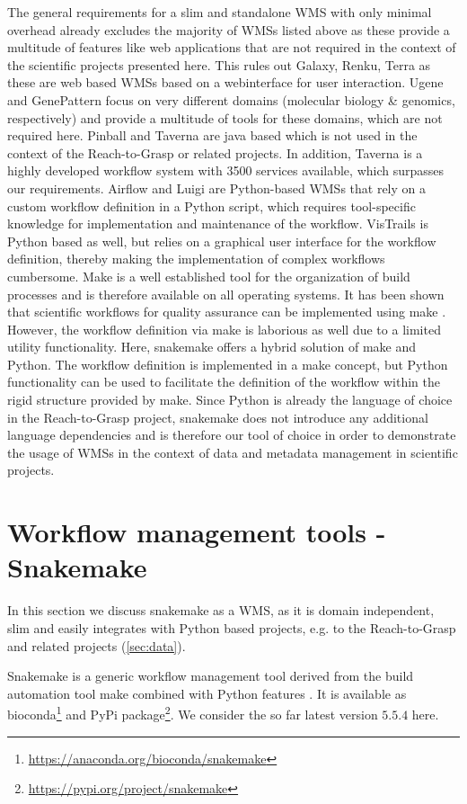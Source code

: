 The general requirements for a slim and standalone WMS with only minimal overhead already excludes the majority of WMSs listed above as these provide a multitude of features like web applications that are not required in the context of the scientific projects presented here. This rules out Galaxy, Renku, Terra as these are web based WMSs based on a webinterface for user interaction. Ugene and GenePattern focus on very different domains (molecular biology \& genomics, respectively) and provide a multitude of tools for these domains, which are not required here. Pinball and Taverna are java based which is not used in the context of the Reach-to-Grasp or related projects.  In addition, Taverna is a highly developed workflow system with 3500 services available, which surpasses our requirements. Airflow and Luigi are Python-based WMSs that rely on a custom workflow definition in a Python script, which requires tool-specific knowledge for implementation and maintenance of the workflow. VisTrails is Python based as well, but relies on a graphical user interface for the workflow definition, thereby making the implementation of complex workflows cumbersome. Make is a well established tool for the organization of build processes and is therefore available on all operating systems. It has been shown that scientific workflows for quality assurance can be implemented using make \citep{Askren_2016}. However, the workflow definition via make is laborious as well due to a limited utility functionality. Here, snakemake offers a hybrid solution of make and Python. The workflow definition is implemented in a make concept, but Python functionality can be used to facilitate the definition of the workflow within the rigid structure provided by make. Since Python is already the language of choice in the Reach-to-Grasp project, snakemake does not introduce any additional language dependencies and is therefore our tool of choice in order to demonstrate the usage of WMSs in the context of data and metadata management in scientific projects.


\section{Workflow management tools - Snakemake}
\label{sec:snakemake}
In this section we discuss snakemake as a WMS, as it is domain independent, slim and easily integrates with Python based projects, e.g. to the Reach-to-Grasp and related projects (\cref{sec:data}).

Snakemake is a generic workflow management tool derived from the build automation tool make combined with Python features \citep{Koster_2012}. It is available as bioconda\footnote{\url{https://anaconda.org/bioconda/snakemake}} and PyPi package\footnote{\url{https://pypi.org/project/snakemake}}. We consider the so far latest version $5.5.4$ here.

